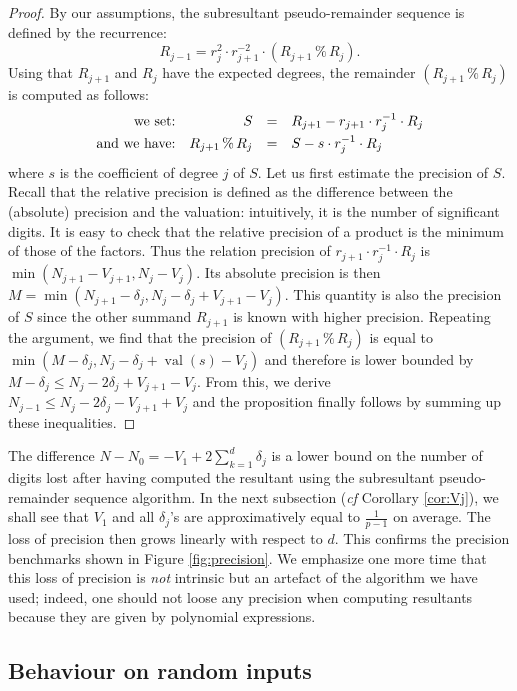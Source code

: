 \documentclass{article}
\DeclareMathOperator{\val}{val}
\begin{document}
\begin{proof}
By our assumptions, the subresultant pseudo-remainder sequence 
is defined by the recurrence:
$$R_{j-1} = r_j^2 \cdot r_{j+1}^{-2} \cdot 
(R_{j+1} \,\%\, R_j).$$
Using that $R_{j+1}$ and $R_j$ have the expected degrees, the
remainder $(R_{j+1} \,\%\, R_j)$ is computed as follows:
$$\begin{array}{rrcl}
\text{we set:} & S & = & R_{j+1} - r_{j+1} \cdot r_j^{-1} \cdot R_j \smallskip \\
\text{and we have:} & R_{j+1} \,\%\, R_j & = & S - s \cdot r_j^{-1} \cdot R_j
\end{array}$$
where $s$ is the coefficient of degree $j$ of $S$. Let us first estimate 
the precision of $S$. Recall that the relative precision is defined 
as the difference between the (absolute) precision and the valuation: 
intuitively, it is the number of significant digits. It is easy to check 
that the relative precision of a product is the minimum of those of the 
factors. 
Thus the relation precision of $r_{j+1} \cdot r_j^{-1} \cdot R_j$ is
$\min(N_{j+1} - V_{j+1}, N_j - V_j)$. Its absolute precision is then
$M = \min(N_{j+1} - \delta_j, N_j - \delta_j + V_{j+1} - V_j)$. This
quantity is also the precision of $S$ since the other summand
$R_{j+1}$ is known with higher precision. Repeating the argument, we
find that the precision of $(R_{j+1} \,\%\, R_j)$ is equal to 
$\min(M - \delta_j, N_j - \delta_j + \val(s) - V_j)$ and therefore is 
lower bounded by $M - \delta_j \leq N_j - 2 \delta_j + V_{j+1} - V_j$.
From this, we derive $N_{j-1} \leq N_j - 2 \delta_j - V_{j+1} + V_j$ and
the proposition finally follows by summing up these inequalities.
\end{proof}

The difference 
$N - N_0 = - V_1 + 2 \sum_{k=1}^d \delta_j$
is a lower bound on the number of digits lost after having computed the 
resultant using the subresultant pseudo-remainder sequence algorithm. In 
the next subsection (\emph{cf} Corollary \ref{cor:Vj}), we shall see that 
$V_1$ and all $\delta_j$'s are 
approximatively equal to $\frac 1 {p-1}$ on average. The loss of 
precision then grows linearly with respect to $d$. This confirms the 
precision benchmarks shown in Figure \ref{fig:precision}.
We emphasize one more time that this loss of precision is \emph{not}
intrinsic but an artefact of the algorithm we have used; indeed, one
should not loose any precision when computing resultants because they
are given by polynomial expressions.

\subsection{Behaviour on random inputs}
\end{document}
